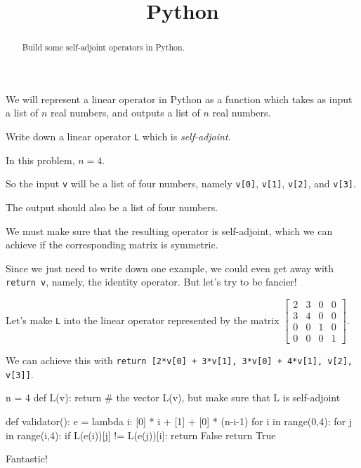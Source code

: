 \documentclass{ximera}
\title{Python}
\begin{document}
\begin{abstract}
  Build some self-adjoint operators in Python.
\end{abstract}\maketitle	

\begin{question}
  We will represent a linear operator in Python as a function which takes as input a list of $n$ real numbers, and outputs a list of $n$ real numbers.

  Write down a linear operator \texttt{L} which is \textit{self-adjoint}.
  \begin{solution}
    \begin{hint}
      In this problem, $n = 4$.
    \end{hint}
    \begin{hint}
      So the input \texttt{v} will be a list of four numbers, namely \texttt{v[0]}, \texttt{v[1]}, \texttt{v[2]}, and \texttt{v[3]}.
    \end{hint}
    \begin{hint}
      The output should also be a list of four numbers.
    \end{hint}
    \begin{hint}
      We must make sure that the resulting operator is self-adjoint, which we can achieve if the corresponding matrix is symmetric.
    \end{hint}
    \begin{hint}
      Since we just need to write down one example, we could even get away with \texttt{return v}, namely, the identity operator.  But let's try to be fancier!
    \end{hint}
    \begin{hint}
      Let's make \texttt{L} into the linear operator represented by the matrix $\begin{bmatrix} 2 & 3 & 0 & 0 \\ 3 & 4 & 0 & 0 \\ 0 & 0 & 1 & 0 \\ 0 & 0 & 0 & 1 \end{bmatrix}$.
    \end{hint}
    \begin{hint}
      We can achieve this with \texttt{return [2*v[0] + 3*v[1], 3*v[0] + 4*v[1], v[2], v[3]]}.
    \end{hint}
    \begin{python}
n = 4
def L(v):
  return # the vector L(v), but make sure that L is self-adjoint

def validator():
  e = lambda i: [0] * i + [1] + [0] * (n-i-1)
  for i in range(0,4):
    for j in range(i,4):   
      if L(e(i))[j] != L(e(j))[i]:
        return False
  return True
    \end{python}
  \end{solution}

Fantastic!

\end{question}
\end{document}

